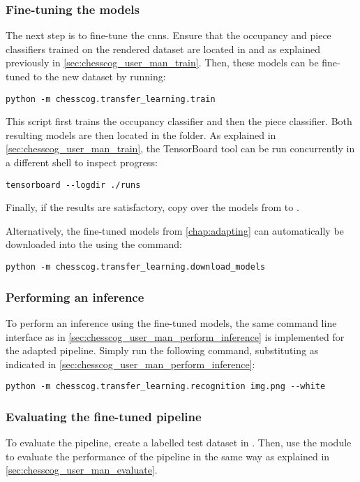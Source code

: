 \documentclass[../../report.tex]{subfiles}
\begin{document}
\subsubsection{Fine-tuning the models}
The next step is to fine-tune the \glspl{cnn}. 
Ensure that the occupancy and piece classifiers trained on the rendered dataset are located in  and  as explained previously in \cref{sec:chesscog_user_man_train}.
Then, these models can be fine-tuned to the new dataset by running:
\begin{verbatim}
python -m chesscog.transfer_learning.train
\end{verbatim}
This script first trains the occupancy classifier and then the piece classifier.
Both resulting models are then located in the  folder.
As explained in \cref{sec:chesscog_user_man_train}, the TensorBoard tool can be run concurrently in a different shell to inspect progress:
\begin{verbatim}
tensorboard --logdir ./runs
\end{verbatim}
Finally, if the results are satisfactory, copy over the models from  to .

Alternatively, the fine-tuned models from \cref{chap:adapting} can automatically be downloaded into the  using the command:
\begin{verbatim}
python -m chesscog.transfer_learning.download_models
\end{verbatim}

\subsubsection{Performing an inference}
To perform an inference using the fine-tuned models, the same command line interface as in \cref{sec:chesscog_user_man_perform_inference} is implemented for the adapted pipeline.
Simply run the following command, substituting as indicated in \cref{sec:chesscog_user_man_perform_inference}:
\begin{verbatim}
python -m chesscog.transfer_learning.recognition img.png --white
\end{verbatim}

\subsubsection{Evaluating the fine-tuned pipeline}
To evaluate the pipeline, create a labelled test dataset in .
Then, use the  module to evaluate the performance of the pipeline in the same way as explained in \cref{sec:chesscog_user_man_evaluate}.
\end{document}
